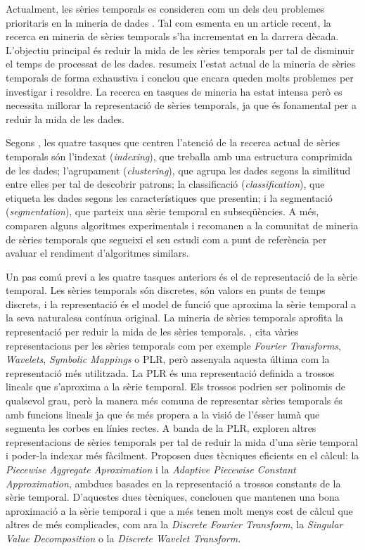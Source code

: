 Actualment, les sèries temporals es consideren com un dels deu
problemes prioritaris en la mineria de dades \parencite{yangwu06}. Tal
com esmenta \textcite{fu11} en un article recent, la recerca en
mineria de sèries temporals s'ha incrementat en la darrera
dècada. L'objectiu principal és reduir la mida de les sèries temporals
per tal de disminuir el temps de processat de les dades.
\citeauthor{fu11} resumeix l'estat actual de la mineria de sèries
temporals de forma exhaustiva i conclou que encara queden molts
problemes per investigar i resoldre. La recerca en tasques de mineria
ha estat intensa però es necessita millorar la representació de sèries
temporals, ja que és fonamental per a reduir la mida de les dades.

Segons \textcite{keogh02}, les quatre tasques que centren l'atenció de
la recerca actual de sèries temporals són l'indexat (\emph{indexing}),
que treballa amb una estructura comprimida de les dades; l'agrupament
(\emph{clustering}), que agrupa les dades segons la similitud entre
elles per tal de descobrir patrons; la classificació
(\emph{classification}), que etiqueta les dades segons les
característiques que presentin; i la segmentació
(\emph{segmentation}), que parteix una sèrie temporal en
subseqüències.  A més, \citeauthor{keogh02} comparen alguns algoritmes
experimentals i recomanen a la comunitat de mineria de sèries temporals que
segueixi el seu estudi com a punt de referència per avaluar el
rendiment d'algoritmes similars.



Un pas comú previ a les quatre tasques anteriors és el de
representació de la sèrie temporal. Les sèries temporals són
discretes, són valors en punts de temps discrets, i la representació
és el model de funció que aproxima la sèrie temporal a la seva
naturalesa contínua original. La mineria de sèries temporals aprofita
la representació per reduir la mida de les sèries temporals. 
\textcite{last:keogh}, cita vàries representacions per les sèries
temporals com per exemple \emph{Fourier Transforms}, \emph{Wavelets},
\emph{Symbolic Mappings} o \gls{PLR}, però assenyala aquesta última
com la representació més utilitzada.  La
\gls{PLR} \parencite{keogh97,keogh98} és una representació definida a
trossos lineals que s'aproxima a la sèrie temporal. Els trossos
podrien ser polinomis de qualsevol grau, però la manera més comuna de
representar sèries temporals és amb funcions lineals ja que és més
propera a la visió de l'ésser humà que segmenta les corbes en línies
rectes.  A banda de la \gls{PLR}, \textcite{keogh00,keogh01} exploren
altres representacions de sèries temporals per tal de reduir la mida
d'una sèrie temporal i poder-la indexar més fàcilment. Proposen dues
tècniques eficients en el càlcul: la \emph{Piecewise Aggregate
  Aproximation} i la \emph{Adaptive Piecewise Constant Approximation},
ambdues basades en la representació a trossos constants de la sèrie
temporal.  D'aquestes dues tècniques, \citeauthor{keogh00,keogh01}
conclouen que mantenen una bona aproximació a la sèrie temporal i que
a més tenen molt menys cost de càlcul que altres de més complicades,
com ara la \emph{Discrete Fourier Transform}, la \emph{Singular Value
  Decomposition} o la \emph{Discrete Wavelet Transform}.

